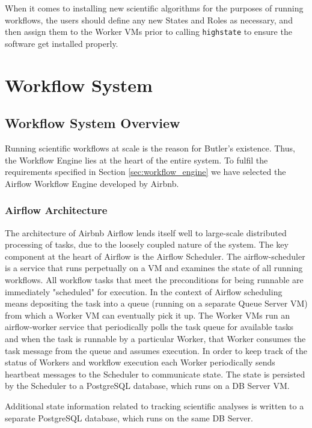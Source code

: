 When it comes to installing new scientific algorithms for the purposes of running workflows, the users should define any new States and Roles as necessary, and then assign them to the Worker VMs prior to calling \texttt{highstate} to ensure the software get installed properly. 

\section{Workflow System}\label{sec:design_workflow_system}
\subsection{Workflow System Overview}
Running scientific workflows at scale is the reason for Butler's existence. Thus, the Workflow Engine lies at the heart of the entire system. To fulfil the requirements specified in Section \ref{sec:workflow_engine} we have selected the Airflow Workflow Engine developed by Airbnb. 

\subsubsection {Airflow Architecture}

The architecture of Airbnb Airflow lends itself well to large-scale distributed processing of tasks, due to the loosely coupled nature of the system. The key component at the heart of Airflow is the Airflow Scheduler. The airflow-scheduler is a service that runs perpetually on a VM and examines the state of all running workflows. All workflow tasks that meet the preconditions for being runnable are immediately "scheduled" for execution. In the context of Airflow scheduling means depositing the task into a queue (running on a separate Queue Server VM) from which a Worker VM can eventually pick it up. The Worker VMs run an airflow-worker service that periodically polls the task queue for available tasks and when the task is runnable by a particular Worker, that Worker consumes the task message from the queue and assumes execution. In order to keep track of the status of Workers and workflow execution each Worker periodically sends heartbeat messages to the Scheduler to communicate state. The state is persisted by the Scheduler to a PostgreSQL database, which runs on a DB Server VM.

Additional state information related to tracking scientific analyses is written to a separate PostgreSQL database, which runs on the same DB Server.

